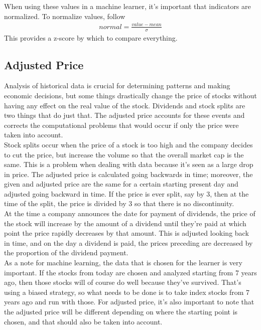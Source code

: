 When using these values in a machine learner, it's important that indicators are normalized. To normalize values, follow
\begin{align*}
normal=\frac{value-mean}{\sigma}
\end{align*}
This provides a z-score by which to compare everything.

\subsection{Adjusted Price}
Analysis of historical data is crucial for determining patterns and making economic decisions, but some things drastically  change the price of stocks without having any effect on the real value of the stock. Dividends and stock splits are two things that do just that. The adjusted price accounts for these events and corrects the computational problems that would occur if only the price were taken into account. \\

Stock splits occur when the price of a stock is too high and the company decides to cut the price, but increase the volume so that the overall market cap is the same. This is a problem when dealing with data because it's seen as a large drop in price. The adjusted price is calculated going backwards in time; moreover, the given and adjusted price are the same for a certain starting present day and adjusted going backward in time. If the price is ever split, say by 3, then at the time of the split, the price is divided by 3 so that there is no discontinuity. \\

At the time a company announces the date for payment of dividends, the price of the stock will increase by the amount of a dividend until they're paid at which point the price rapidly decreases by that amount. This is adjusted looking back in time, and on the day a dividend is paid, the prices preceding are decreased by the proportion of the dividend payment. \\

As a note for machine learning, the data that is chosen for the learner is very important. If the stocks from today are chosen and analyzed starting from 7 years ago, then those stocks will of course do well because they've survived. That's using a biased strategy, so what needs to be done is to take index stocks from 7 years ago and run with those. For adjusted price, it's also important to note that the adjusted price will be different depending on where the starting point is chosen, and that should also be taken into account.

